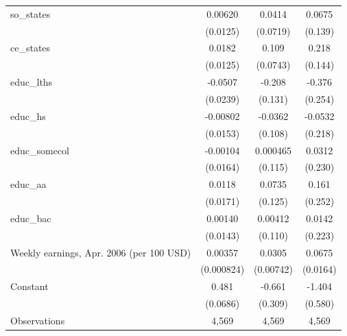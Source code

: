 \begin{table}[htbp]
\begin{tabular}{l*{3}{c}}
\addlinespace
so\_states           &     0.00620         &      0.0414         &      0.0675         \\
                    &    (0.0125)         &    (0.0719)         &     (0.139)         \\
\addlinespace
ce\_states           &      0.0182         &       0.109         &       0.218         \\
                    &    (0.0125)         &    (0.0743)         &     (0.144)         \\
\addlinespace
educ\_lths           &     -0.0507\sym{**} &      -0.208         &      -0.376         \\
                    &    (0.0239)         &     (0.131)         &     (0.254)         \\
\addlinespace
educ\_hs             &    -0.00802         &     -0.0362         &     -0.0532         \\
                    &    (0.0153)         &     (0.108)         &     (0.218)         \\
\addlinespace
educ\_somecol        &    -0.00104         &    0.000465         &      0.0312         \\
                    &    (0.0164)         &     (0.115)         &     (0.230)         \\
\addlinespace
educ\_aa             &      0.0118         &      0.0735         &       0.161         \\
                    &    (0.0171)         &     (0.125)         &     (0.252)         \\
\addlinespace
educ\_bac            &     0.00140         &     0.00412         &      0.0142         \\
                    &    (0.0143)         &     (0.110)         &     (0.223)         \\
\addlinespace
Weekly earnings, Apr. 2006 (per 100 USD)&     0.00357\sym{***}&      0.0305\sym{***}&      0.0675\sym{***}\\
                    &  (0.000824)         &   (0.00742)         &    (0.0164)         \\
\addlinespace
Constant            &       0.481\sym{***}&      -0.661\sym{**} &      -1.404\sym{**} \\
                    &    (0.0686)         &     (0.309)         &     (0.580)         \\
\midrule
Observations        &       4,569         &       4,569         &       4,569         \\

\end{tabular}
\end{table}
